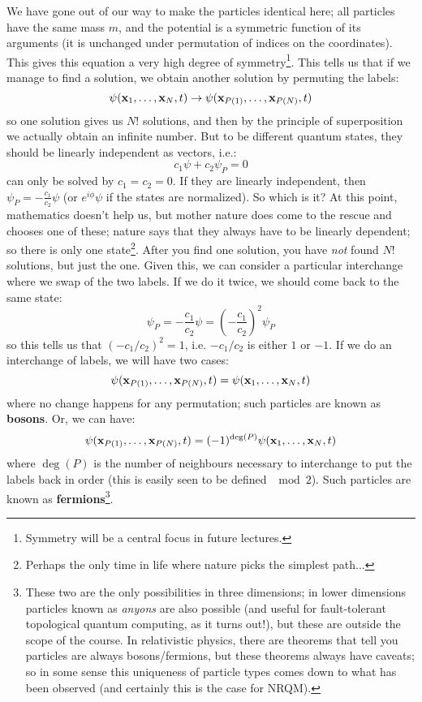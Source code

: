 We have gone out of our way to make the particles identical here; all particles have the same mass $m$, and the potential is a symmetric function of its arguments (it is unchanged under permutation of indices on the coordinates). This gives this equation a very high degree of symmetry\footnote{Symmetry will be a central focus in future lectures.}. This tells us that if we manage to find a solution, we obtain another solution by permuting the labels:
\begin{equation}
    \psi(\mathbf{x}_{1}, \ldots, \mathbf{x}_{N}, t) \to \psi(\mathbf{x}_{P(1)}, \ldots, \mathbf{x}_{P(N)}, t)
\end{equation}
so one solution gives us $N!$ solutions, and then by the principle of superposition we actually obtain an infinite number. But to be different quantum states, they should be linearly independent as vectors, i.e.:
\begin{equation}
    c_1\psi + c_2\psi_P = 0
\end{equation}
can only be solved by $c_1 = c_2 = 0$. If they are linearly independent, then $\psi_P = - \frac{c_1}{c_2}\psi$ (or $e^{i\phi}\psi$ if the states are normalized). So which is it? At this point, mathematics doesn't help us, but mother nature does come to the rescue and chooses one of these; nature says that they always have to be linearly dependent; so there is only one state\footnote{Perhaps the only time in life where nature picks the simplest path...}. After you find one solution, you have \emph{not} found $N!$ solutions, but just the one. Given this, we can consider a particular interchange where we swap of the two labels. If we do it twice, we should come back to the same state:
\begin{equation}
    \psi_P = -\frac{c_1}{c_2}\psi = \left(-\frac{c_1}{c_2}\right)^2 \psi_P
\end{equation}
so this tells us that $(-c_1/c_2)^2 = 1$, i.e. $-c_1/c_2$ is either $1$ or $-1$. If we do an interchange of labels, we will have two cases:
\begin{equation}
    \psi(\mathbf{x}_{P(1)}, \ldots, \mathbf{x}_{P(N)}, t) = \psi(\mathbf{x}_{1}, \ldots, \mathbf{x}_{N}, t) 
\end{equation}
where no change happens for any permutation; such particles are known as \textbf{bosons}. Or, we can have:
\begin{equation}
    \psi(\mathbf{x}_{P(1)}, \ldots, \mathbf{x}_{P(N)}, t) = (-1)^{\deg(P)}\psi(\mathbf{x}_{1}, \ldots, \mathbf{x}_{N}, t) 
\end{equation}
where $\deg(P)$ is the number of neighbours necessary to interchange to put the labels back in order (this is easily seen to be defined $\mod 2$). Such particles are known as \textbf{fermions}\footnote{These two are the only possibilities in three dimensions; in lower dimensions particles known as \emph{anyons} are also possible (and useful for fault-tolerant topological quantum computing, as it turns out!), but these are outside the scope of the course. In relativistic physics, there are theorems that tell you particles are always bosons/fermions, but these theorems always have caveats; so in some sense this uniqueness of particle types comes down to what has been observed (and certainly this is the case for NRQM).}. 

